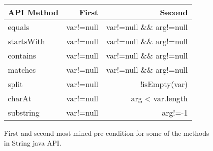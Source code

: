 \begin{figure}
\centering
\scriptsize
\setlength{\tabcolsep}{4pt}
\begin{tabular}{lrr}
\toprule
API Method & First & Second \\
\midrule
equals & var!=null & var!=null \&\& arg!=null  \\
startsWith & var!=null & var!=null \&\& arg!=null \\
contains & var!=null & var!=null \&\& arg!=null \\
matches & var!=null & var!=null \&\& arg!=null \\
split & var!=null & !isEmpty(var) \\
charAt & var!=null & arg < var.length \\
substring & var!=null & arg!=-1 \\
\bottomrule
\end{tabular}%
\caption{First and second most mined pre-condition for some of the methods in String java API.}
\label{fig:precondition}
\end{figure}